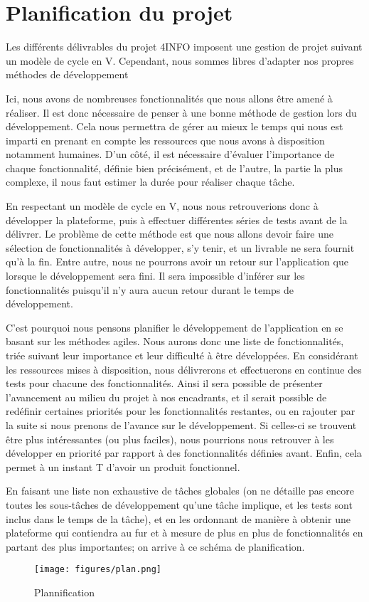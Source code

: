\section{Planification du projet}
\label{sec:orga}

	Les différents délivrables du projet 4INFO imposent une gestion de projet suivant un modèle de cycle en V. Cependant, nous sommes libres d'adapter nos propres méthodes de développement 

	Ici, nous avons de nombreuses fonctionnalités que nous allons être amené à réaliser. Il est donc nécessaire de penser à une bonne méthode de gestion lors du développement. Cela nous permettra de gérer au mieux le temps qui nous est imparti en prenant en compte les ressources que nous avons à disposition notamment humaines. D'un côté, il est nécessaire d'évaluer l'importance de chaque fonctionnalité, définie bien précisément, et de l'autre, la partie la plus complexe, il nous faut estimer la durée pour réaliser chaque tâche.

	En respectant un modèle de cycle en V, nous nous retrouverions donc à développer la plateforme, puis à effectuer différentes séries de tests avant de la délivrer. Le problème de cette méthode est que nous allons devoir faire une sélection de fonctionnalités à développer, s'y tenir, et un livrable ne sera fournit qu'à la fin. Entre autre, nous ne pourrons avoir un retour sur l'application que lorsque le développement sera fini. Il sera impossible d'inférer sur les fonctionnalités puisqu'il n'y aura aucun retour durant le temps de développement. 

	C'est pourquoi nous pensons planifier le développement de l'application en se basant sur les méthodes agiles. Nous aurons donc une liste de fonctionnalités, triée suivant leur importance et leur difficulté à être développées. En considérant les ressources mises à disposition, nous délivrerons et effectuerons en continue des tests pour chacune des fonctionnalités. Ainsi il sera possible de présenter l'avancement au milieu du projet à nos encadrants, et il serait possible de redéfinir certaines priorités pour les fonctionnalités restantes, ou en rajouter par la suite si nous prenons de l'avance sur le développement. Si celles-ci se trouvent être plus intéressantes (ou plus faciles), nous pourrions nous retrouver à les développer en priorité par rapport à des fonctionnalités définies avant. Enfin, cela permet à un instant T d'avoir un produit fonctionnel.

	En faisant une liste non exhaustive de tâches globales (on ne détaille pas encore toutes les sous-tâches de développement qu'une tâche implique, et les tests sont inclus dans le temps de la tâche), et en les ordonnant de manière à obtenir une plateforme qui contiendra au fur et à mesure de plus en plus de fonctionnalités en partant des plus importantes; on arrive à ce schéma de planification.

	\begin{figure}[H]
        \centering
        \texttt{[image: figures/plan.png]}
            \caption{Plannification}
            \label{fig:plan_recherche}
    \end{figure}